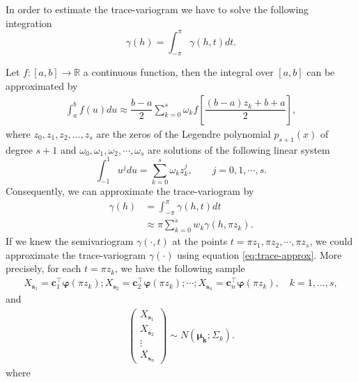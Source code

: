 \documentclass[]{interact}
\theoremstyle{plain}%
\theoremstyle{definition}
\theoremstyle{remark}
\begin{document}
In order to estimate the trace-variogram we have to solve the following integration
\begin{equation}
\gamma(h) = \int_{-\pi}^{\pi} \gamma(h,t) dt.
\label{eq:trace-variogram}
\end{equation}

Let \(f:[a,b] \longrightarrow \mathbb{R}\) a continuous function, then the integral over \([a,b]\) can be approximated by
\begin{align*}
\int_{a}^{b} f(u) du \approx \dfrac{b-a}{2} \sum_{k=0}^{s} \omega_k f \left[\dfrac{(b-a)z_k + b +a}{2}\right],
\end{align*}
where \(z_0,z_1, z_2, \dots, z_s\) are the zeros of the Legendre polynomial \(p_{s+1}(x)\) \citep[pp.~441]{khuri2003advanced} of degree \(s + 1\) and \(\omega_0,\omega_1, \omega_2, \cdots, \omega_s\) are solutions of the following linear system
\begin{equation*}
\int_{-1}^{1} u^j du= \sum_{k=0}^{s} \omega_k z_k^j, \qquad j=0,1, \cdots, s.
\end{equation*}
Consequently, we can approximate the trace-variogram by
\begin{align} 
\nonumber \gamma(h) &= \int_{-\pi}^{\pi} \gamma(h, t)dt \\
&\approx  \pi \sum_{k=0}^{s} w_k \gamma \left( h, \pi z_k \right).
\label{eq:trace-approx}
\end{align}
If we knew the semivariogram \(\gamma(\cdot,t)\) at the points \(t=\pi z_1, \pi z_2, \cdots, \pi z_s\), we could approximate the trace-variogram \(\gamma(\cdot)\) using equation \eqref{eq:trace-approx}. More precisely, for each \(t=\pi z_k\), we have the following sample
\begin{align*}
 X_{\bm{s}_1} = \bm{c}_1^\top \bm{\varphi}(\pi z_k); X_{\bm{s}_2} = \bm{c}_2^\top \bm{\varphi}(\pi z_k); \cdots; X_{\bm{s}_n} = \bm{c}_n^\top \bm{\varphi}(\pi z_k), \quad k=1, \dots, s,
\end{align*}
and
\begin{align*}
 \begin{pmatrix}
  X_{\bm{s}_1}\\
  X_{\bm{s}_2}\\
  \vdots\\
  X_{\bm{s}_n}
 \end{pmatrix}
\sim N\left(\bm{\mu_k};\Sigma_k \right).
\end{align*}
where
\end{document}
